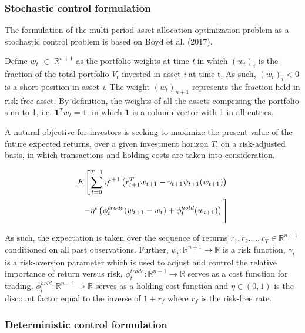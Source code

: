 \subsubsection{Stochastic control formulation}
The formulation of the multi-period asset allocation optimization problem as a stochastic control problem is based on Boyd et al. (2017). 

Define $w_t$ $\in$ $\mathbb{R}^{n+1}$ as the portfolio weights at time \textit{t} in which $(w_t)_{i}$ is the fraction of the total portfolio $V_t$ invested in asset \textit{i} at time t. As such, $(w_t)_{i} < 0$ is a short position in asset \textit{i}. The weight $(w_t)_{{n+1}}$ represents the fraction held in risk-free asset. By definition, the weights of all the assets comprising the portfolio sum to 1, i.e. $\mathbf{1}^Tw_t = 1$, in which $\mathbf{1}$ is a column vector with 1 in all entries. 

A natural objective for investors is seeking to maximize the present value of the future expected returns, over a given investment horizon $T$, on a risk-adjusted basis, in which transactions and holding costs are taken into consideration.

\begin{equation}
\begin{split}
    E\left[\sum_{t=0}^{T-1}\eta^{t+1}\left(r_{t+1}^Tw_{t+1} -\gamma_{t+1}\psi_{t+1}(w_{t+1})\right) \right. \\
    \left. -\eta^t\left(\phi_t^{trade}(w_{t+1}-w_t)+\phi_t^{hold}(w_{t+1})\right)
    \vphantom{\sum_{t=0}^{T-1}} \right]
    \label{eq: MPC_stochastic}
\end{split}
\end{equation}

As such, the expectation is taken over the sequence of returns $r_1, r_2...., r_T \in \mathbb{R}^{n+1}$ conditioned on all past observations. Further, $\psi_t:\mathbb{R}^{n+1} \rightarrow \mathbb{R}$ is a risk function, $\gamma_t$ is a risk-aversion parameter which is used to adjust and control the relative importance of return versus risk, $\phi_t^{trade}: \mathbb{R}^{n+1}\rightarrow\mathbb{R}$ serves as a cost function for trading, $\phi_t^{hold}: \mathbb{R}^{n+1}\rightarrow\mathbb{R}$ serves as a holding cost function and $\eta \in (0,1)$ is the discount factor equal to the inverse of $1+r_f$ where $r_f$ is the risk-free rate.  

\subsubsection{Deterministic control formulation}

